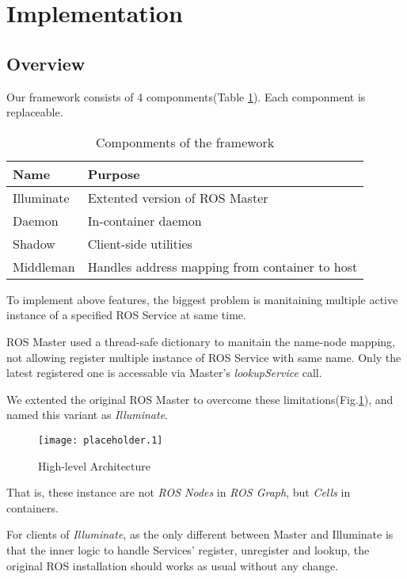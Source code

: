 \section{Implementation}

\subsection{Overview}
Our framework consists of 4 componments(Table \ref{table:componments}).
Each componment is replaceable.

\begin{table}[H]
    \renewcommand{\arraystretch}{1.3}
    \caption{Componments of the framework}
    \label{table:componments}
    \centering
    \begin{tabular}{ll}
        \hline
        \bfseries Name & \bfseries Purpose \\
        \hline
        Illuminate & Extented version of ROS Master \\ 
        Daemon     & In-container daemon \\
        Shadow     & Client-side utilities \\
        Middleman  & Handles address mapping from container to host \\
        \hline
    \end{tabular}
\end{table} 

To implement above features, the biggest problem is manitaining multiple active instance of a specified ROS Service at same time.

ROS Master used a thread-safe dictionary to manitain the name-node mapping,
not allowing register multiple instance of ROS Service with same name.
Only the latest registered one is accessable via Master's \emph{lookupService} call.

We extented the original ROS Master to overcome these limitations(Fig.\ref{figure:illuminate}),
and named this variant as \emph{Illuminate}.

\begin{figure}[h]
\centering
\texttt{[image: placeholder.1]}
\caption{High-level Architecture}
\label{figure:illuminate}
\end{figure}

That is, these instance are not \emph{ROS Nodes} in \emph{ROS Graph}, but \emph{Cells} in containers.

For clients of \emph{Illuminate}, as the only different between Master and Illuminate is that the inner logic to handle Services' register,
unregister and lookup, the original ROS installation should works as usual without any change.

